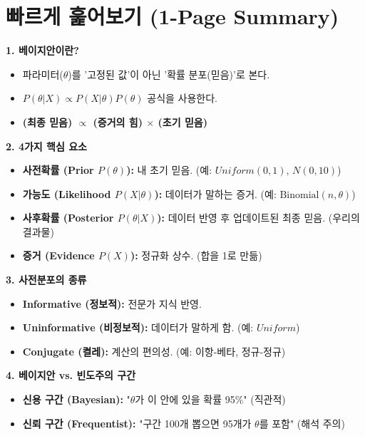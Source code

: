 \documentclass[11pt,a4paper]{book}
\theoremstyle{definition}
\begin{document}
\section{빠르게 훑어보기 (1-Page Summary)}

\begin{summarybox}
    \textbf{1. 베이지안이란?}
    \begin{itemize}
        \item 파라미터($\theta$)를 '고정된 값'이 아닌 '확률 분포(믿음)'로 본다.
        \item $P(\theta | X) \propto P(X | \theta) P(\theta)$ 공식을 사용한다.
        \item \textbf{(최종 믿음) $\propto$ (증거의 힘) $\times$ (초기 믿음)}
    \end{itemize}
    
    \textbf{2. 4가지 핵심 요소}
    \begin{itemize}
        \item \textbf{사전확률 (Prior $P(\theta)$):} 내 초기 믿음. (예: $Uniform(0,1)$, $N(0, 10)$)
        \item \textbf{가능도 (Likelihood $P(X|\theta)$):} 데이터가 말하는 증거. (예: $\text{Binomial}(n, \theta)$)
        \item \textbf{사후확률 (Posterior $P(\theta|X)$):} 데이터 반영 후 업데이트된 최종 믿음. (우리의 결과물)
        \item \textbf{증거 (Evidence $P(X)$):} 정규화 상수. (합을 1로 만듦)
    \end{itemize}
    
    \textbf{3. 사전분포의 종류}
    \begin{itemize}
        \item \textbf{Informative (정보적):} 전문가 지식 반영.
        \item \textbf{Uninformative (비정보적):} 데이터가 말하게 함. (예: $Uniform$)
        \item \textbf{Conjugate (켤레):} 계산의 편의성. (예: 이항-베타, 정규-정규)
    \end{itemize}
    
    \textbf{4. 베이지안 vs. 빈도주의 구간}
    \begin{itemize}
        \item \textbf{신용 구간 (Bayesian):} "$\theta$가 이 안에 있을 확률 95\%" (직관적)
        \item \textbf{신뢰 구간 (Frequentist):} "구간 100개 뽑으면 95개가 $\theta$를 포함" (해석 주의)
    \end{itemize}
    

\end{summarybox}
\end{document}
